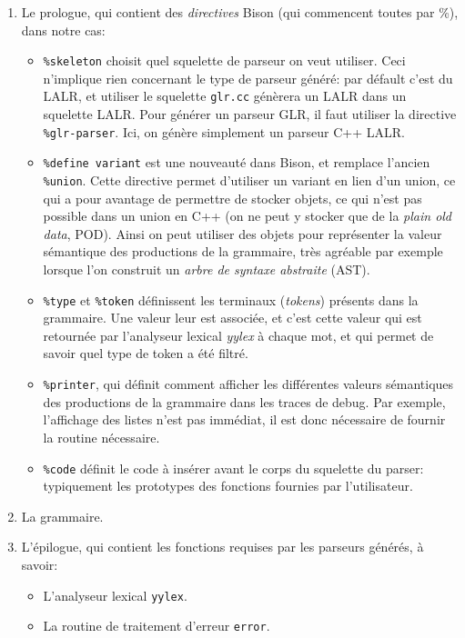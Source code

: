 \documentclass[a4paper,11pt,twoside,final]{article}
\begin{document}
  \begin{enumerate}
    \item Le prologue, qui contient des \textit{directives} Bison (qui
      commencent toutes par \%), dans notre cas:
      \begin{itemize}
        \item \texttt{\%skeleton} choisit quel squelette de parseur on veut
            utiliser. Ceci n'implique rien concernant le type de parseur
            généré: par défault c'est du LALR, et utiliser le squelette
            \texttt{glr.cc} génèrera un LALR dans un squelette LALR\@. Pour
            générer un parseur GLR, il faut utiliser la directive
            \texttt{\%glr-parser}. Ici, on génère simplement un parseur C++
            LALR\@.
        \item \texttt{\%define variant} est une nouveauté dans Bison, et
            remplace l'ancien \texttt{\%union}. Cette directive permet
            d'utiliser un variant en lien d'un union, ce qui a pour avantage
            de permettre de stocker objets, ce qui n'est pas possible dans un
            union en C++ (on ne peut y stocker que de la
            \textit{plain old data}, POD). Ainsi on peut utiliser des
            objets pour représenter la valeur sémantique des productions de
            la grammaire, très agréable par exemple lorsque l'on construit
            un \textit{arbre de syntaxe abstraite} (AST).
        \item \texttt{\%type} et \texttt{\%token} définissent les terminaux
            (\textit{tokens}) présents dans la grammaire. Une valeur leur est
            associée, et c'est cette valeur qui est retournée par l'analyseur
            lexical \textit{yylex} à chaque mot, et qui permet de savoir quel
            type de token a été filtré.
        \item \texttt{\%printer}, qui définit comment afficher les
            différentes valeurs sémantiques des productions de la grammaire
            dans les traces de debug.  Par exemple, l'affichage des listes
            n'est pas immédiat, il est donc nécessaire de fournir la routine
            nécessaire.
        \item \texttt{\%code} définit le code à insérer avant le corps du
            squelette du parser: typiquement les prototypes des fonctions
            fournies par l'utilisateur.
      \end{itemize}
    \item La grammaire.
    \item L'épilogue, qui contient les fonctions requises par les parseurs
      générés, à savoir:
      \begin{itemize}
        \item L'analyseur lexical \texttt{yylex}.
        \item La routine de traitement d'erreur \texttt{error}.
      \end{itemize}
  \end{enumerate}
\end{document}
